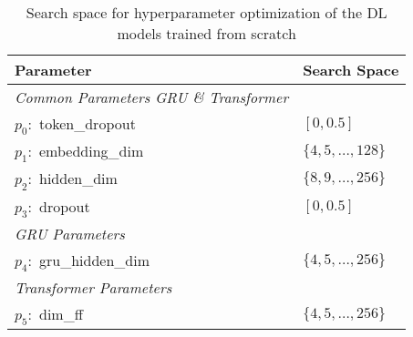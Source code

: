 \begin{table}[!ht]
	\centering
	\begin{tabular}{lm{6cm}}
		\toprule
		\textbf{Parameter} & \textbf{Search Space} \\
		\midrule
		\emph{Common Parameters GRU \& Transformer} & \\
		\cmidrule(r){1-2}
		$p_0:$ token\_dropout & $[0, 0.5]$ \\
		$p_1:$ embedding\_dim & $\{4, 5, \dots, 128\}$ \\
		$p_2:$ hidden\_dim & $\{8, 9, \dots, 256\}$\\
		$p_3:$ dropout & $[0, 0.5]$ \\
		\midrule
		\emph{GRU Parameters} & \\
		\cmidrule(r){1-2}
		$p_4:$ gru\_hidden\_dim & $\{4, 5, \dots, 256\}$ \\
		\midrule
		\emph{Transformer Parameters} & \\
		\cmidrule(r){1-2}
		$p_5:$ dim\_ff & $\{4, 5, \dots, 256\}$ \\
		\bottomrule
	\end{tabular}
	\caption{Search space for hyperparameter optimization of the DL models trained from scratch}
	\label{table-dl-searchspace}
\end{table}
